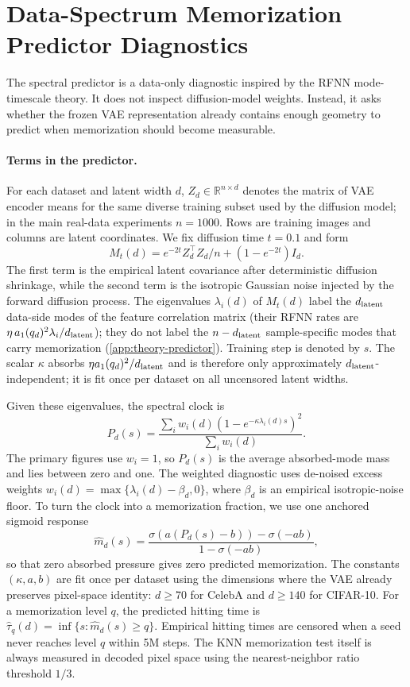 \FloatBarrier

\section{Data-Spectrum Memorization Predictor Diagnostics}
\label{app:spectral-predictor-clean}

The spectral predictor is a data-only diagnostic inspired by the RFNN
mode-timescale theory. It does not inspect diffusion-model weights. Instead,
it asks whether the frozen VAE representation already contains enough
geometry to predict when memorization should become measurable.

\paragraph{Terms in the predictor.}
For each dataset and latent width $d$, $Z_d\in\mathbb R^{n\times d}$ denotes
the matrix of VAE encoder means for the same diverse training subset used by
the diffusion model; in the main real-data experiments $n=1000$. Rows are
training images and columns are latent coordinates. We fix diffusion time
$t=0.1$ and form
\[
M_t(d)=e^{-2t}Z_d^\top Z_d/n+(1-e^{-2t})I_d.
\]
The first term is the empirical latent covariance after deterministic
diffusion shrinkage, while the second term is the isotropic Gaussian noise
injected by the forward diffusion process. The eigenvalues $\lambda_i(d)$ of $M_t(d)$ label the $d_{\mathrm{latent}}$ data-side modes of the feature correlation matrix (their RFNN rates are $\eta\,a_1(q_d)^2\lambda_i/d_{\mathrm{latent}}$); they do not label the $n-d_{\mathrm{latent}}$ sample-specific modes that carry memorization (\cref{app:theory-predictor}). Training step is denoted by $s$. The scalar $\kappa$ absorbs $\eta a_1(q_d)^2/d_{\mathrm{latent}}$ and is therefore only approximately $d_{\mathrm{latent}}$-independent; it is fit once per dataset on all uncensored latent widths.

Given these eigenvalues, the spectral clock is
\[
P_d(s)=\frac{\sum_i w_i(d)\left(1-e^{-\kappa\lambda_i(d)s}\right)^2}{\sum_i w_i(d)}.
\]
The primary figures use $w_i=1$, so $P_d(s)$ is the average absorbed-mode
mass and lies between zero and one. The weighted diagnostic uses
de-noised excess weights $w_i(d)=\max\{\lambda_i(d)-\beta_d,0\}$, where
$\beta_d$ is an empirical isotropic-noise floor. To turn the clock into a
memorization fraction, we use one anchored sigmoid response
\[
\widehat m_d(s)=\frac{\sigma(a(P_d(s)-b))-\sigma(-ab)}{1-\sigma(-ab)},
\]
so that zero absorbed pressure gives zero predicted memorization. The
constants $(\kappa,a,b)$ are fit once per dataset using the dimensions where
the VAE already preserves pixel-space identity: $d\ge70$ for CelebA and
$d\ge140$ for CIFAR-10. For a memorization level $q$, the predicted hitting
time is $\hat\tau_q(d)=\inf\{s:\widehat m_d(s)\ge q\}$. Empirical hitting
times are censored when a seed never reaches level $q$ within 5M steps. The
KNN memorization test itself is always measured in decoded pixel space using
the nearest-neighbor ratio threshold $1/3$.

